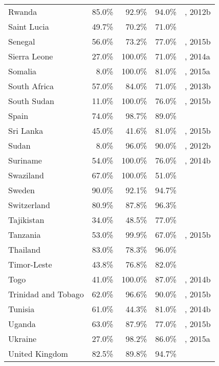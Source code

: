 \begin{longtable}{lrrrl}
  Rwanda & 85.0\% & 92.9\% & 94.0\% & \cite{Unaids2016-an}, 2012b \\
  Saint Lucia & 49.7\% & 70.2\% & 71.0\% & \cite{Unaids2016-an, Unaids2016-am} \\
  Senegal & 56.0\% & 73.2\% & 77.0\% & \cite{Unaids2016-an}, 2015b \\
  Sierra Leone & 27.0\% & 100.0\% & 71.0\% & \cite{Unaids2016-an}, 2014a \\
  Somalia & 8.0\% & 100.0\% & 81.0\% & \cite{Unaids2016-an}, 2015a \\
  South Africa & 57.0\% & 84.0\% & 71.0\% & \cite{Unaids2016-an}, 2013b \\
  South Sudan & 11.0\% & 100.0\% & 76.0\% & \cite{Unaids2016-an}, 2015b \\
  Spain & 74.0\% & 98.7\% & 89.0\% & \cite{Unaids2016-an} \\
  Sri Lanka & 45.0\% & 41.6\% & 81.0\% & \cite{Unaids2016-an}, 2015b \\
  Sudan & 8.0\% & 96.0\% & 90.0\% & \cite{Unaids2016-an}, 2012b \\
  Suriname & 54.0\% & 100.0\% & 76.0\% & \cite{Unaids2016-an}, 2014b \\
  Swaziland & 67.0\% & 100.0\% & 51.0\% & \cite{Unaids2016-an} \\
  Sweden & 90.0\% & 92.1\% & 94.7\% & \cite{croi2016} \\
  Switzerland & 80.9\% & 87.8\% & 96.3\% & \cite{ias2015} \\
  Tajikistan & 34.0\% & 48.5\% & 77.0\% & \cite{Unaids2016-an} \\
  Tanzania & 53.0\% & 99.9\% & 67.0\% & \cite{Unaids2016-an}, 2015b \\
  Thailand & 83.0\% & 78.3\% & 96.0\% & \cite{Unaids2016-an} \\
  Timor-Leste & 43.8\% & 76.8\% & 82.0\% & \cite{Unaids2016-am} \\
  Togo & 41.0\% & 100.0\% & 87.0\% & \cite{Unaids2016-an}, 2014b \\
  Trinidad and Tobago & 62.0\% & 96.6\% & 90.0\% & \cite{Unaids2016-an}, 2015b \\
  Tunisia & 61.0\% & 44.3\% & 81.0\% & \cite{Unaids2016-an}, 2014b \\
  Uganda & 63.0\% & 87.9\% & 77.0\% & \cite{Unaids2016-an}, 2015b \\
  Ukraine & 27.0\% & 98.2\% & 86.0\% & \cite{Unaids2016-an}, 2015a \\
  United Kingdom & 82.5\% & 89.8\% & 94.7\% & \cite{ukhIv2015} \\

\end{longtable}
